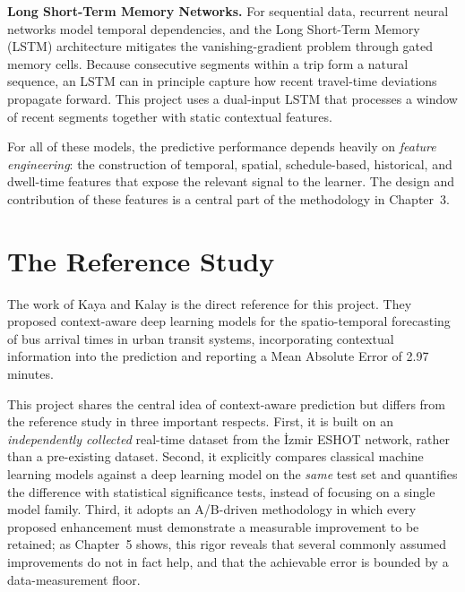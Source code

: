 \textbf{Long Short-Term Memory Networks.} For sequential data, recurrent neural networks model temporal dependencies, and the Long Short-Term Memory (LSTM) architecture \cite{hochreiter1997} mitigates the vanishing-gradient problem through gated memory cells. Because consecutive segments within a trip form a natural sequence, an LSTM can in principle capture how recent travel-time deviations propagate forward. This project uses a dual-input LSTM that processes a window of recent segments together with static contextual features.

For all of these models, the predictive performance depends heavily on \emph{feature engineering}: the construction of temporal, spatial, schedule-based, historical, and dwell-time features that expose the relevant signal to the learner. The design and contribution of these features is a central part of the methodology in Chapter~3.

\section{The Reference Study}

The work of Kaya and Kalay \cite{kaya2025} is the direct reference for this project. They proposed context-aware deep learning models for the spatio-temporal forecasting of bus arrival times in urban transit systems, incorporating contextual information into the prediction and reporting a Mean Absolute Error of 2.97 minutes.

This project shares the central idea of context-aware prediction but differs from the reference study in three important respects. First, it is built on an \emph{independently collected} real-time dataset from the İzmir ESHOT network, rather than a pre-existing dataset. Second, it explicitly compares classical machine learning models against a deep learning model on the \emph{same} test set and quantifies the difference with statistical significance tests, instead of focusing on a single model family. Third, it adopts an A/B-driven methodology in which every proposed enhancement must demonstrate a measurable improvement to be retained; as Chapter~5 shows, this rigor reveals that several commonly assumed improvements do not in fact help, and that the achievable error is bounded by a data-measurement floor.
